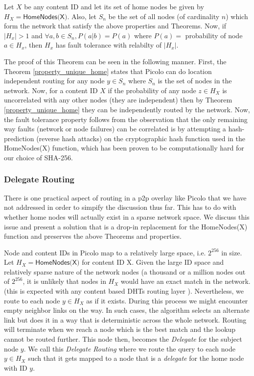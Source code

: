 \begin{theorem}
   
    Let \(X\) be any content ID and let its set of home nodes be given by \( H_X = \textsf{HomeNodes(X)} \). Also, let \(S_n\) be
    the set of all nodes (of cardinality \(n\)) which form the network that satisfy the above properties and Theorems.
    Now, if \( |H_x| > 1 \) and \( \forall a, b \in S_n, P(a|b) = P(a) \) where \( P(a) = \) probability of node \(a \in
    H_x \), then \(H_x\) has fault tolerance with relabilty of \( | H_x | \).

\end{theorem}

The proof of this Theorem can be seen in the following manner. First, the Theorem \ref{property_unique_home} states that
\textsf{Picolo} can do location independent routing for any node \(y \in S_n\) where \(S_n\) is the set of nodes in the network.
Now, for a content ID \(X\) if the probability of any node \(z \in H_X\) is uncorrelated with any other nodes (they are
independent) then by Theorem \ref{property_unique_home} they can be independently routed by the network. Now, the fault
tolerance property follows from the observation that the only remaining way faults (network or node failures) can be
correlated is by attempting a hash-prediction (reverse hash attacks) on the cryptographic hash function used in the
\textsf{HomeNodes(X)} function, which has been proven to be computationally hard for our choice of SHA-256.

\subsubsection{Delegate Routing}

There is one practical aspect of routing in a p2p overlay like \textsf{Picolo} that we have not addressed in order to
simpify the discussion thus far.  This has to do with whether home nodes will actually exist in a sparse network space.
We discuss this issue and present a solution that is a drop-in replacement for the \textsf{HomeNodes(X)} function and
preserves the above Theorems and properties.

Node and content IDs in \textsf{Picolo} map to a relatively large space, i.e. \(2^{256}\) in size. Let \( H_X =
\textsf{HomeNodes(X)}\) for content ID X. Given the large ID space and relatively sparse nature of the network nodes (a
thousand or a million nodes out of \(2^{256}\), it is unlikely that nodes in \(H_X\) would have an exact match in the
network. (this is expected with any content based DHTs routing layer \cite{Stoica_2001, Rowstron_2001}).
Nevertheless, we route to each node \(y \in H_X\) as if it exists. During this process we might encounter empty neighbor
links on the way. In such cases, the algorithm selects an alternate link but does it in a way that is deterministic
across the whole network. Routing will terminate when we reach a node which is the best match and the lookup cannot be
routed further. This node then, becomes the {\em Delegate} for the subject node \(y\). We call this {\em Delegate
Routing} where we route the query to each node \(y \in H_X \) such that it gets mapped to a node that is a {\em
delegate} for the home node with ID \(y\).


